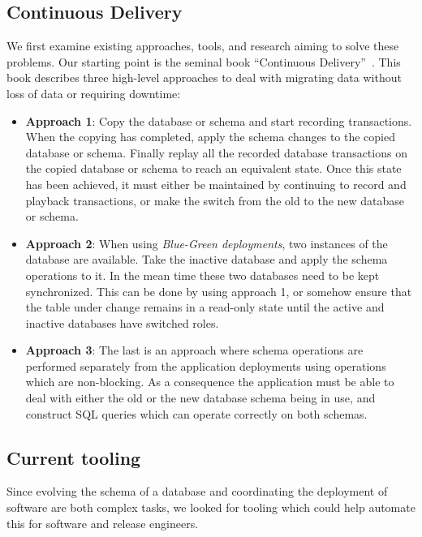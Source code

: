 \documentclass[conference]{IEEEtran}
\begin{document}

\subsection{Continuous Delivery}\label{sec:cd}

We first examine existing approaches, tools, and research aiming to solve these problems. Our starting point is the seminal book ``Continuous Delivery''~\cite{Humble:2010:CDR:1869904}. This book describes three high-level approaches to deal with migrating data without loss of data or requiring downtime:

\begin{itemize}
  \item{\textbf{Approach 1}: Copy the database or schema and start recording transactions. When the copying has completed, apply the schema changes to the copied database or schema. Finally replay all the recorded database transactions on the copied database or schema to reach an equivalent state. Once this state has been achieved, it must either be maintained by continuing to record and playback transactions, or make the switch from the old to the new database or schema.}
  \item{\textbf{Approach 2}: When using \textit{Blue-Green deployments}, two instances of the database are available. Take the inactive database and apply the schema operations to it. In the mean time these two databases need to be kept synchronized. This can be done by using approach 1, or somehow ensure that the table under change remains in a read-only state until the active and inactive databases have switched roles.}
  \item{\textbf{Approach 3}: The last is an approach where schema operations are performed separately from the application deployments using operations which are non-blocking. As a consequence the application must be able to deal with either the old or the new database schema being in use, and construct SQL queries which can operate correctly on both schemas.}
\end{itemize}

\subsection{Current tooling} 
Since evolving the schema of a database and coordinating the deployment of software are both complex tasks, we looked for tooling which could help automate this for software and release engineers.
\end{document}

